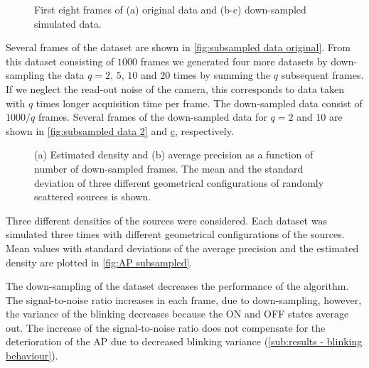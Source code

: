 \begin{figure}[!tb]	
	\newcommand{\widthfig}{1\textwidth}
	\centering	
	
	
	
	\caption{First eight frames of (a) original data and (b-c) down-sampled simulated data. }
	\label{fig:subsampled data}
\end{figure} 
%
Several frames of the dataset are shown in \autoref{fig:subsampled data original}. From this dataset consisting of $1000$ frames we generated four more datasets by down-sampling the data $q=2,\,5,\,10$ and $20$ times by summing the $q$ subsequent frames. If  we neglect the read-out noise of the camera, this corresponds to data taken with $q$ times longer acquisition time per frame. The down-sampled data consist of $1000/q$ frames. Several frames of the down-sampled data for $q=2$ and $10$ are shown in \autoref{fig:subsampled data 2} and \hyperref[fig:subsampled data 10]{c}, respectively. 
%
\begin{figure}[!tb]	
	\newcommand{\wf}{.45\textwidth}
	\newcommand{\sizef}{.38}
	\centering
	\caption{(a) Estimated density and (b) average precision as a function of number of down-sampled frames. The mean and the standard deviation of three different geometrical configurations of randomly scattered sources is shown.}
	\label{fig:AP subsampled}
\end{figure}

Three different densities of the sources were considered. Each dataset was simulated three times with different geometrical configurations of the sources. Mean values with standard deviations of the average precision and the estimated density are plotted in \autoref{fig:AP subsampled}. 

The down-sampling of the dataset decreases the performance of the \inmf{} algorithm. The signal-to-noise ratio increases in each frame, due to down-sampling, however, the variance of the blinking decreases because the ON and OFF states average out. The increase of the signal-to-noise ratio does not compensate for the deterioration of the AP due to decreased blinking variance (\autoref{sub:results - blinking behaviour}). 

